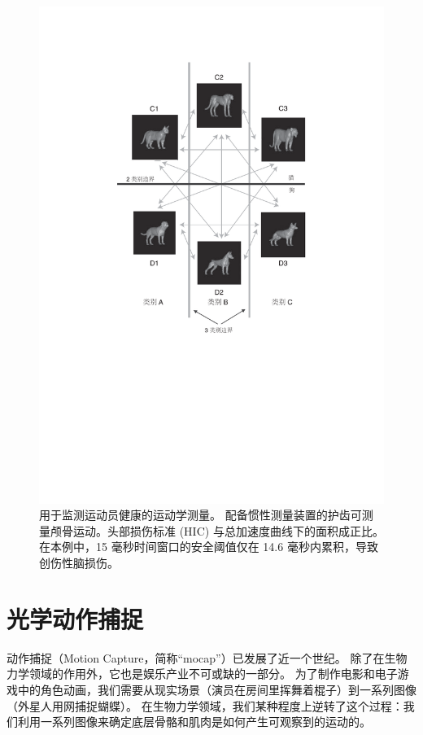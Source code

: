 \begin{figure}[!htb]
	\centering
	\includegraphics[width=1.0\linewidth]{chap7/7_5}
	\caption{用于监测运动员健康的运动学测量。
		配备惯性测量装置的护齿可测量颅骨运动。头部损伤标准 (HIC) 与总加速度曲线下的面积成正比。
		在本例中，15 毫秒时间窗口的安全阈值仅在 14.6 毫秒内累积，导致创伤性脑损伤\cite{hernandez2015six}。 \label{fig:7_5}}
\end{figure}



\section{光学动作捕捉}

动作捕捉（Motion Capture，简称“mocap”）已发展了近一个世纪。
除了在生物力学领域的作用外，它也是娱乐产业不可或缺的一部分。
为了制作电影和电子游戏中的角色动画，我们需要从现实场景（演员在房间里挥舞着棍子）到一系列图像（外星人用网捕捉蝴蝶）。
在生物力学领域，我们某种程度上逆转了这个过程：我们利用一系列图像来确定底层骨骼和肌肉是如何产生可观察到的运动的。


